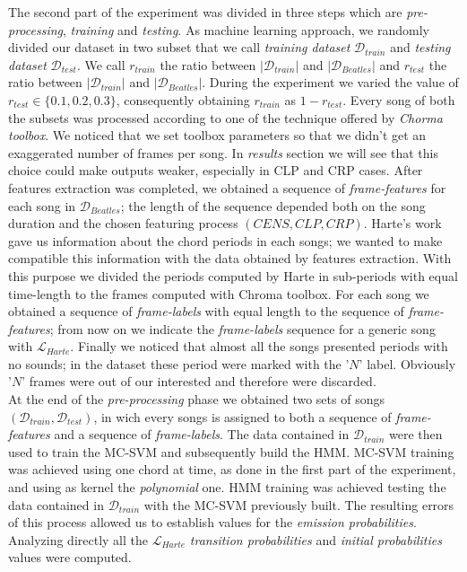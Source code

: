 The second part of the experiment was divided in three steps which are \textit{pre-processing}, \textit{training} and \textit{testing}. As machine learning approach, we randomly divided our dataset in two subset that we call \textit{training dataset} $\mathcal{D}_{train}$ and \textit{testing dataset}  $\mathcal{D}_{test}$. We call $r_{train}$ the ratio between $|\mathcal{D}_{train}|$ and $|\mathcal{D}_{Beatles}|$ and $r_{test}$ the ratio between $|\mathcal{D}_{train}|$ and $|\mathcal{D}_{Beatles}|$. During the experiment we varied the value of $r_{test} \in \{0.1,0.2,0.3\}$, consequently obtaining $r_{train}$ as $1-r_{test}$. Every song of both the subsets was processed according to one of the technique offered by \textit{Chorma toolbox}. We noticed that we set toolbox parameters so that we didn't get an exaggerated number of frames per song. In \textit{results} section we will see that this choice could make outputs weaker, especially in CLP and CRP cases. After features extraction was completed, we obtained a sequence of \textit{frame-features} for each song in $\mathcal{D}_{Beatles}$; the length of the sequence depended both on the song duration and the chosen featuring process $(CENS,CLP,CRP)$. Harte's work gave us information about the chord periods in each songs; we wanted to make compatible this information with the data obtained by features extraction. With this purpose we divided the periods computed by Harte in sub-periods with equal time-length to the frames computed with Chroma toolbox. For each song we obtained a sequence of \textit{frame-labels} with equal length to the sequence of \textit{frame-features}; from now on we indicate the \textit{frame-labels} sequence for a generic song with $\mathcal{L}_{Harte}$. Finally we noticed that almost all the songs presented periods with no sounds; in the dataset these period were marked with the '$N$' label. Obviously '$N$' frames were out of our interested and therefore were discarded. \\
%
At the end of the \textit{pre-processing} phase we obtained two sets of songs $(\mathcal{D}_{train},\mathcal{D}_{test})$, in wich every songs is assigned to both a sequence of \textit{frame-features} and a sequence of \textit{frame-labels}. The data contained in $\mathcal{D}_{train}$ were then used to train the MC-SVM and subsequently build the HMM. MC-SVM training was achieved using one chord at time, as done in the first part of the experiment, and using as kernel the \textit{polynomial} one. HMM training was achieved testing the data contained in $\mathcal{D}_{train}$ with the MC-SVM previously built. The resulting errors of this process allowed us to establish values for the \textit{emission probabilities}. Analyzing directly all the $\mathcal{L}_{Harte}$ \textit{transition probabilities} and \textit{initial probabilities} values were computed. \\
